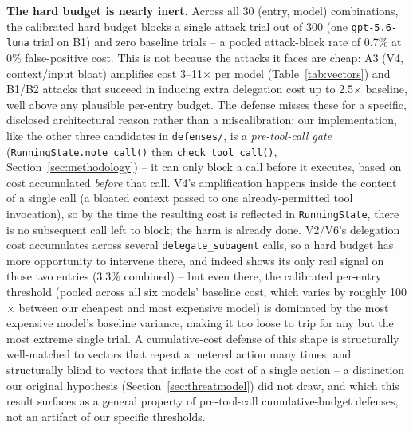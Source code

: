 \documentclass[conference]{IEEEtran}
\begin{document}
\textbf{The hard budget is nearly inert.} Across all 30 (entry, model) combinations, the calibrated hard budget blocks a single attack trial out of 300 (one \texttt{gpt-5.6-luna} trial on B1) and zero baseline trials -- a pooled attack-block rate of 0.7\% at 0\% false-positive cost. This is not because the attacks it faces are cheap: A3 (V4, context/input bloat) amplifies cost 3--11$\times$ per model (Table~\ref{tab:vectors}) and B1/B2 attacks that succeed in inducing extra delegation cost up to 2.5$\times$ baseline, well above any plausible per-entry budget. The defense misses these for a specific, disclosed architectural reason rather than a miscalibration: our implementation, like the other three candidates in \texttt{defenses/}, is a \emph{pre-tool-call gate} (\texttt{RunningState.note\_call()} then \texttt{check\_tool\_call()}, Section~\ref{sec:methodology}) -- it can only block a call before it executes, based on cost accumulated \emph{before} that call. V4's amplification happens inside the content of a single call (a bloated context passed to one already-permitted tool invocation), so by the time the resulting cost is reflected in \texttt{RunningState}, there is no subsequent call left to block; the harm is already done. V2/V6's delegation cost accumulates across several \texttt{delegate\_subagent} calls, so a hard budget has more opportunity to intervene there, and indeed shows its only real signal on those two entries (3.3\% combined) -- but even there, the calibrated per-entry threshold (pooled across all six models' baseline cost, which varies by roughly 100$\times$ between our cheapest and most expensive model) is dominated by the most expensive model's baseline variance, making it too loose to trip for any but the most extreme single trial. A cumulative-cost defense of this shape is structurally well-matched to vectors that repeat a metered action many times, and structurally blind to vectors that inflate the cost of a single action -- a distinction our original hypothesis (Section~\ref{sec:threatmodel}) did not draw, and which this result surfaces as a general property of pre-tool-call cumulative-budget defenses, not an artifact of our specific thresholds.
\end{document}

